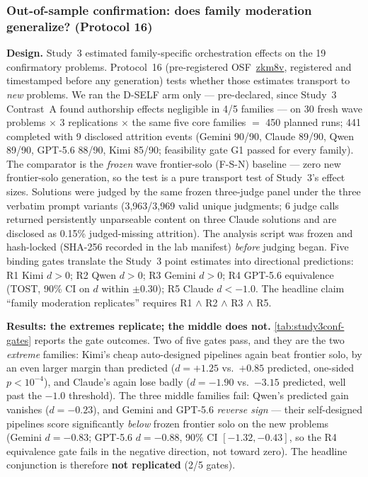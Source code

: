 \documentclass[12pt,a4paper]{article}
\begin{document}
\subsubsection{Out-of-sample confirmation: does family moderation generalize? (Protocol 16)}\label{sec:study3conf}

\textbf{Design.} Study~3 estimated family-specific orchestration effects on
the 19 confirmatory problems. Protocol~16 (pre-registered
OSF~\href{https://osf.io/zkm8v}{zkm8v}, registered and timestamped before any
generation) tests whether those estimates transport to \emph{new} problems.
We ran the D-SELF arm only --- pre-declared, since Study~3 Contrast~A found
authorship effects negligible in 4/5 families --- on 30 fresh wave problems
$\times$ 3 replications $\times$ the same five core families $=$ 450 planned
runs; 441 completed with 9 disclosed attrition events (Gemini 90/90, Claude
89/90, Qwen 89/90, GPT-5.6 88/90, Kimi 85/90; feasibility gate G1 passed for
every family). The comparator is the \emph{frozen} wave frontier-solo (F-S-N)
baseline --- zero new frontier-solo generation, so the test is a pure
transport test of Study~3's effect sizes. Solutions were judged by the same
frozen three-judge panel under the three verbatim prompt variants
(3{,}963/3{,}969 valid unique judgments; 6 judge calls returned persistently
unparseable content on three Claude solutions and are disclosed as 0.15\%
judged-missing attrition). The analysis script was frozen and hash-locked
(SHA-256 recorded in the lab manifest) \emph{before} judging began. Five
binding gates translate the Study~3 point estimates into directional
predictions: R1 Kimi $d > 0$; R2 Qwen $d > 0$; R3 Gemini $d > 0$; R4 GPT-5.6
equivalence (TOST, 90\% CI on $d$ within $\pm 0.30$); R5 Claude $d < -1.0$.
The headline claim ``family moderation replicates'' requires
R1 $\wedge$ R2 $\wedge$ R3 $\wedge$ R5.

\textbf{Results: the extremes replicate; the middle does not.}
\cref{tab:study3conf-gates} reports the gate outcomes. Two of five gates
pass, and they are the two \emph{extreme} families: Kimi's cheap
auto-designed pipelines again beat frontier solo, by an even larger margin
than predicted ($d = +1.25$ vs.\ $+0.85$ predicted, one-sided
$p < 10^{-4}$), and Claude's again lose badly ($d = -1.90$ vs.\ $-3.15$
predicted, well past the $-1.0$ threshold). The three middle families fail:
Qwen's predicted gain vanishes ($d = -0.23$), and Gemini and GPT-5.6
\emph{reverse sign} --- their self-designed pipelines score significantly
\emph{below} frozen frontier solo on the new problems (Gemini $d = -0.83$;
GPT-5.6 $d = -0.88$, 90\% CI $[-1.32, -0.43]$, so the R4 equivalence gate
fails in the negative direction, not toward zero). The headline conjunction
is therefore \textbf{not replicated} (2/5 gates).
\end{document}
